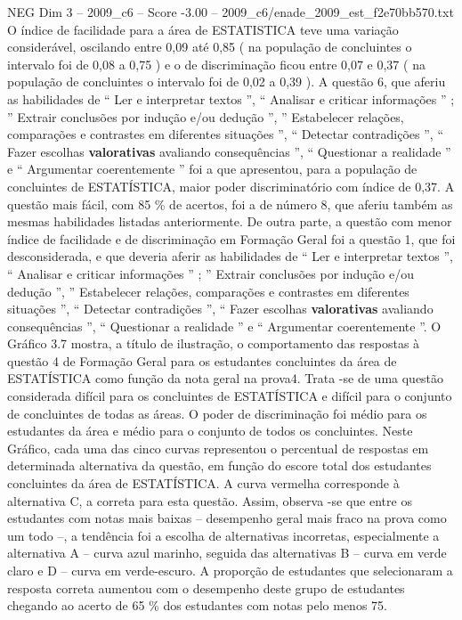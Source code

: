 \begin{textsample}{NEG Dim 3 – 2009\_c6 – Score -3.00 – 2009\_c6/enade\_2009\_est\_f2e70bb570.txt}
O índice de facilidade para a área de ESTATISTICA teve uma variação considerável, oscilando entre 0,09 até 0,85 ( na população de concluintes o intervalo foi de 0,08 a 0,75 ) e o de discriminação ficou entre 0,07 e 0,37 ( na população de concluintes o intervalo foi de 0,02 a 0,39 ).
A questão 6, que aferiu as habilidades de “ Ler e interpretar textos ”, “ Analisar e criticar informações ” ; ” Extrair conclusões por indução e/ou dedução ”, ” Estabelecer relações, comparações e contrastes em diferentes situações ”, “ Detectar contradições ”, “ Fazer escolhas \textbf{valorativas} avaliando consequências ”, “ Questionar a realidade ” e “ Argumentar coerentemente ” foi a que apresentou, para a população de concluintes de ESTATÍSTICA, maior poder discriminatório com índice de 0,37.
A questão mais fácil, com 85 \% de acertos, foi a de número 8, que aferiu também as mesmas habilidades listadas anteriormente.
De outra parte, a questão com menor índice de facilidade e de discriminação em Formação Geral foi a questão 1, que foi desconsiderada, e que deveria aferir as habilidades de “ Ler e interpretar textos ”, “ Analisar e criticar informações ” ; ” Extrair conclusões por indução e/ou dedução ”, ” Estabelecer relações, comparações e contrastes em diferentes situações ”, “ Detectar contradições ”, “ Fazer escolhas \textbf{valorativas} avaliando consequências ”, “ Questionar a realidade ” e “ Argumentar coerentemente ”.
O Gráfico 3.7 mostra, a título de ilustração, o comportamento das respostas à questão 4 de Formação Geral para os estudantes concluintes da área de ESTATÍSTICA como função da nota geral na prova4.
Trata -se de uma questão considerada difícil para os concluintes de ESTATÍSTICA e difícil para o conjunto de concluintes de todas as áreas.
O poder de discriminação foi médio para os estudantes da área e médio para o conjunto de todos os concluintes.
Neste Gráfico, cada uma das cinco curvas representou o percentual de respostas em determinada alternativa da questão, em função do escore total dos estudantes concluintes da área de ESTATÍSTICA.
A curva vermelha corresponde à alternativa C, a correta para esta questão.
Assim, observa -se que entre os estudantes com notas mais baixas – desempenho geral mais fraco na prova como um todo –, a tendência foi a escolha de alternativas incorretas, especialmente a alternativa A – curva azul marinho, seguida das alternativas B – curva em verde claro e D – curva em verde-escuro.
A proporção de estudantes que selecionaram a resposta correta aumentou com o desempenho deste grupo de estudantes chegando ao acerto de 65 \% dos estudantes com notas pelo menos 75.

\end{textsample}
